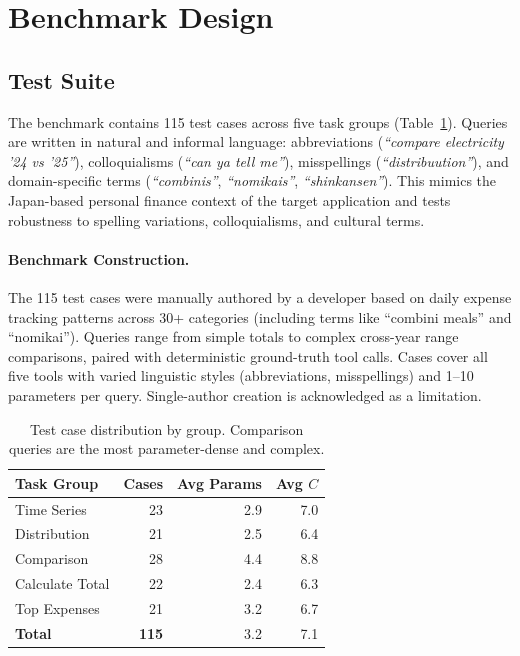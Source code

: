 \documentclass[11pt,twocolumn]{article}
\begin{document}
\section{Benchmark Design}
\label{sec:benchmark}

\subsection{Test Suite}

The benchmark contains 115 test cases across five task groups
(Table~\ref{tab:tc_distribution}).
Queries are written in natural and informal language: abbreviations
(\emph{``compare electricity '24 vs '25''}), colloquialisms
(\emph{``can ya tell me''}), misspellings (\emph{``distribuution''}),
and domain-specific terms (\emph{``combinis''}, \emph{``nomikais''},
\emph{``shinkansen''}).
This mimics the Japan-based personal finance context of the target
application and tests robustness to spelling variations,
colloquialisms, and cultural terms.

\paragraph{Benchmark Construction.}
The 115 test cases were manually authored by a developer based on daily expense tracking patterns across 30+ categories (including terms like ``combini meals'' and ``nomikai'').
Queries range from simple totals to complex cross-year range comparisons, paired with deterministic ground-truth tool calls.
Cases cover all five tools with varied linguistic styles (abbreviations, misspellings) and 1--10 parameters per query.
Single-author creation is acknowledged as a limitation.

\begin{table}[t]
\centering
\small
\begin{tabular}{@{}lrrr@{}}
\toprule
\textbf{Task Group} & \textbf{Cases} & \textbf{Avg Params} & \textbf{Avg $C$} \\
\midrule
Time Series     & 23 & 2.9 & 7.0 \\
Distribution    & 21 & 2.5 & 6.4 \\
Comparison      & 28 & 4.4 & 8.8 \\
Calculate Total & 22 & 2.4 & 6.3 \\
Top Expenses    & 21 & 3.2 & 6.7 \\
\midrule
\textbf{Total}  & \textbf{115} & 3.2 & 7.1 \\
\bottomrule
\end{tabular}
\caption{Test case distribution by group. Comparison queries are the
most parameter-dense and complex.}
\label{tab:tc_distribution}
\end{table}
\end{document}
